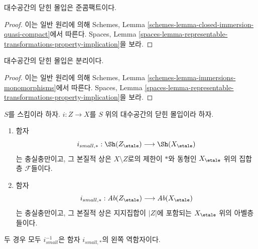 \begin{lemma}
\label{lemma-closed-immersion-quasi-compact}
대수공간의 닫힌 몰입은 준콤팩트이다.
\end{lemma}

\begin{proof}
이는 일반 원리에 의해 Schemes, Lemma
\ref{schemes-lemma-closed-immersion-quasi-compact}에서 따른다.
Spaces, Lemma
\ref{spaces-lemma-representable-transformations-property-implication}을 보라.
\end{proof}

\begin{lemma}
\label{lemma-closed-immersion-separated}
대수공간의 닫힌 몰입은 분리이다.
\end{lemma}

\begin{proof}
이는 일반 원리에 의해 Schemes, Lemma
\ref{schemes-lemma-immersions-monomorphisms}에서 따른다.
Spaces, Lemma
\ref{spaces-lemma-representable-transformations-property-implication}을 보라.
\end{proof}

\begin{lemma}
\label{lemma-closed-immersion-push-pull}
$S$를 스킴이라 하자. $i : Z \to X$를 $S$ 위의 대수공간의
닫힌 몰입이라 하자.
\begin{enumerate}
\item 함자
$$
i_{small, *} :
\Sh(Z_\etale)
\longrightarrow
\Sh(X_\etale)
$$
는 충실충만이고, 그 본질적 상은 $X \setminus Z$로의 제한이
$*$와 동형인 $X_\etale$ 위의 집합층 $\mathcal{F}$들이다.
\item 함자
$$
i_{small, *} :
\textit{Ab}(Z_\etale)
\longrightarrow
\textit{Ab}(X_\etale)
$$
는 충실충만이고, 그 본질적 상은 지지집합이 $|Z|$에 포함되는
$X_\etale$ 위의 아벨층들이다.
\end{enumerate}
두 경우 모두 $i_{small}^{-1}$은 함자 $i_{small, *}$의 왼쪽
역함자이다.
\end{lemma}

